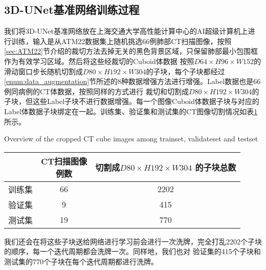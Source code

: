 \subsection{3D-UNet基准网络训练过程}\label{sec:baseline_experiment_training}
我们将3D-UNet基准网络放在上海交通大学高性能计算中心的AI超级计算机上进行训练，输入是从ATM22数据集上随机挑选66例肺部CT扫描图像，按照
\ref{sec:ATM22}节介绍的裁切方法去掉无关的黑色背景区域，只保留肺部最小包围框作为有效学习区域。然后将这些经裁切的Cuboid体数据
按照$D64 \times H96 \times W152$的滑动窗口步长随机切割成$D80 \times H192 \times W304$的子块，每个子块都经过
\ref{enum:data_augmentation}节所述的8种数据增强方法进行增强。Label数据也是66例同病例的CT体数据，按照同样的方式进行
裁切和切割成$D80 \times H192 \times W304$的子块，但这些Label子块不进行数据增强。每一个图像Cuboid体数据子块与对应的
Label体数据子块绑定在一起。训练集、验证集和测试集的CT图像切割情况如表\ref{tbl:dataset_overview}所示。
\begin{table}[!htp]
        {Overview of the cropped CT cube images among trainset, validateset and testset}
    \label{tbl:dataset_overview}
    \centering
    \begin{tabular}{c|c|c}
        \toprule
          & \makecell{CT扫描图像\\例数} & \makecell{切割成$D80 \times H192 \times W304$\\的子块总数} \\
        \midrule
        训练集 & 66 & 2202 \\
        验证集 & 9  & 415 \\
        测试集 & 19 & 770 \\
        \bottomrule 
    \end{tabular}
\end{table}
我们还会在将这些子块送给网络进行学习前会进行一次洗牌，完全打乱2202个子块的顺序，每一个迭代周期都会洗牌一次。同样地，我们也对
验证集的415个子块和测试集的770个子块在每个迭代周期都进行洗牌。

